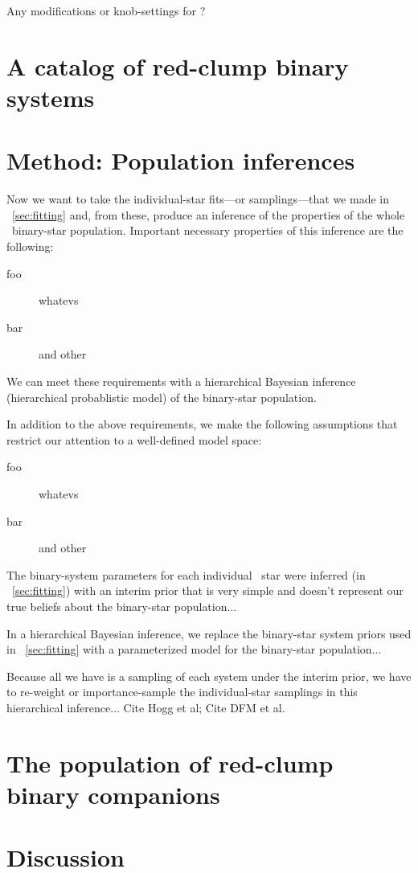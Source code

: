 \documentclass[modern, letterpaper]{aastex61}
\newcommand{\thejoker}{\project{The~Joker}}
\newcommand{\RC}{\acronym{RC}}
\begin{document}
Any modifications or knob-settings for \thejoker?

\section{A catalog of red-clump binary systems}

\section{Method: Population inferences}\label{sec:popinference}

Now we want to take the individual-star fits---or samplings---that
we made in \sectionname~\ref{sec:fitting} and, from these, produce
an inference of the properties of the whole \RC\ binary-star population.
Important necessary properties of this inference are the following:
\begin{description}
\item[foo] whatevs
\item[bar] and other
\end{description}
We can meet these requirements with a hierarchical Bayesian inference
(hierarchical probablistic model) of the binary-star population.

In addition to the above requirements, we make the following assumptions
that restrict our attention to a well-defined model space:
\begin{description}
\item[foo] whatevs
\item[bar] and other
\end{description}

The binary-system parameters for each individual \RC\ star were
inferred (in \sectionname~\ref{sec:fitting}) with an interim prior that
is very simple and doesn't represent our true beliefs about the
binary-star population...

In a hierarchical Bayesian inference, we replace the binary-star
system priors used in \sectionname~\ref{sec:fitting} with a parameterized
model for the binary-star population...

Because all we have is a sampling of each system under the interim prior,
we have to re-weight or importance-sample the individual-star samplings
in this hierarchical inference... Cite Hogg et al; Cite DFM et al.

\section{The population of red-clump binary companions}

\section{Discussion}
\end{document}
